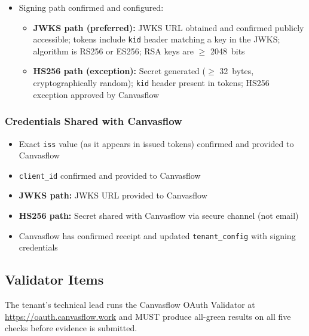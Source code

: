 \begin{itemize}[label=$\square$, leftmargin=2em]
  \item Signing path confirmed and configured:
    \begin{itemize}[label=$\square$, leftmargin=2em]
      \item \textbf{JWKS path (preferred):} JWKS URL obtained and confirmed publicly
        accessible; tokens include \texttt{kid} header matching a key in the JWKS;
        algorithm is RS256 or ES256; RSA keys are $\geq$ 2048~bits
      \item \textbf{HS256 path (exception):} Secret generated ($\geq$ 32~bytes,
        cryptographically random); \texttt{kid} header present in tokens; HS256
        exception approved by Canvasflow
    \end{itemize}
\end{itemize}

\subsubsection*{Credentials Shared with Canvasflow}

\begin{itemize}[label=$\square$, leftmargin=2em]
  \item Exact \texttt{iss} value (as it appears in issued tokens) confirmed and provided
    to Canvasflow
  \item \texttt{client\_id} confirmed and provided to Canvasflow
  \item \textbf{JWKS path:} JWKS URL provided to Canvasflow
  \item \textbf{HS256 path:} Secret shared with Canvasflow via secure channel (not
    email)
  \item Canvasflow has confirmed receipt and updated \texttt{tenant\_config} with signing
    credentials
\end{itemize}

\subsection*{Validator Items}

\begin{notebox}
The tenant's technical lead runs the Canvasflow OAuth Validator at
\url{https://oauth.canvasflow.work} and MUST produce all-green results on all five
checks before evidence is submitted.
\end{notebox}

